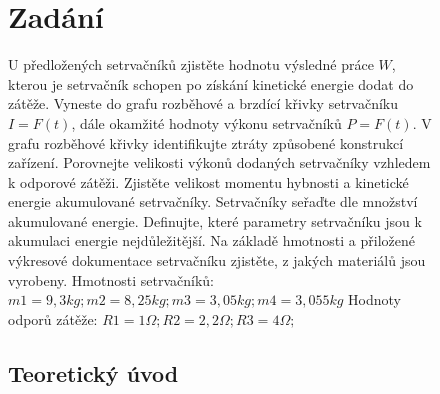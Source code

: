 \documentclass{article}
\begin{document}





\begin{figure}
\section*{Zadání}
U předložených setrvačníků zjistěte hodnotu výsledné práce \(W\), kterou je setrvačník schopen po získání kinetické energie dodat do zátěže.
Vyneste do grafu rozběhové a brzdící křivky setrvačníku \(I = F (t)\), dále okamžité hodnoty výkonu setrvačníků \(P = F (t)\). 
V grafu rozběhové křivky identifikujte ztráty způsobené konstrukcí zařízení. 
Porovnejte velikosti výkonů dodaných setrvačníky vzhledem k odporové zátěži.
Zjistěte velikost momentu hybnosti a kinetické energie akumulované setrvačníky. 
Setrvačníky seřaďte dle množství akumulované energie. 
Definujte, které parametry setrvačníku jsou k akumulaci energie nejdůležitější.
Na základě hmotnosti a přiložené výkresové dokumentace setrvačníku zjistěte, z jakých materiálů jsou vyrobeny.
Hmotnosti setrvačníků: \(m1 = 9,3 kg; m2 = 8,25 kg; m3 = 3,05 kg; m4 = 3,055 kg\)
Hodnoty odporů zátěže: \(R1 = 1 Ω; R2 = 2,2 Ω; R3 = 4 Ω;\)

\subsection{Teoretický úvod}



\end{figure}
\end{document}
